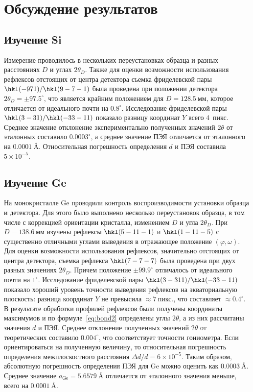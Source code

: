 \documentclass[a4paper,14pt]{extarticle}
\newcommand{\unit}[1]{ \ \text{#1}}
\newcommand{\degree}{^\circ}
\newcounter{x}
\begin{document}
\section{Обсуждение результатов}
\subsection{Изучение Si}
Измерение проводилось в нескольких переустановках образца и разных расстояниях $D$ и углах $2\theta_D$.
Также для оценки возможности использования рефлексов отстоящих от центра детектора съемка фриделевской пары $\hkl(-9 7 1)/\hkl(9 -7 -1)$ была проведена при положении детектора $2\theta_D = \pm 97.5\degree$, что является крайним положением для $D = 128.5\unit{мм}$, которое отличается от идеального почти на $0.8\degree$.
Исследование фриделевской пары $\hkl(3 -3 1)/\hkl(-3 3 -11)$ показало разницу координат $Y$ всего 4~пикс.
Среднее значение отклонение экспериментально полученных значений $2\theta$ от эталонных составило $0.0003\degree$, а среднее значение ПЭЯ отличается от эталонного на $0.0001\unit{\AA}$.
Относительная погрешность определения $d$ и ПЭЯ составила $5 \times 10^{-5}$.
\subsection{Изучение Ge}
На монокристалле Ge проводили контроль воспроизводимости установки образца и детектора.
Для этого было выполнено несколько переустановок образца, в том числе с коррекцией ориентации кристалла, изменением $D$ и угла $2\theta_D$.
При $D = 138.6\unit{мм}$ изучены рефлексы $\hkl(5 -11 -1)$ и $\hkl(1 -11 -5)$ с существенно отличными углами выведения в отражающее положение $(\varphi, \omega)$.
Для оценки возможности использования рефлексов, значительно отстоящих от центра детектора, съемка рефлекса $\hkl(7 -7 -7)$ была проведена при двух разных значениях $2\theta_D$.
Причем положение $\pm 99.9\degree$ отличалось от идеального почти на $1\degree$.
Исследование фриделевской пары $\hkl(3 -3 11)/\hkl(-3 3 -11)$ показало хороший уровень точности выведения рефлексов на экваториальную плоскость: разница координат $Y$ не превысила $\approx 7\unit{пикс.}$, что составляет $\approx 0.4\degree$.
В результате обработки профилей рефлексов были получены координаты максимумов и по формуле~\ref{eq:bond2} определены углы $2\theta$, а из них рассчитаны значения $d$ и ПЭЯ.
Среднее отклонение полученных значений $2\theta$ от теоретических составило $0.004\degree$, что соответствует точности гониометра.
Если ориентироваться на полученную величину, то относительная погрешность определения межплоскостного расстояния $\Delta d / d = 6 \times 10^{-5}$.
Таким образом, абсолютную погрешность определения ПЭЯ для Ge можно оценить как $0.0003\unit{\AA}$.
Среднее значение $a_\text{Ge} = 5.6579\unit{\AA}$ отличается от эталонного значения меньше, всего на $0.0001\unit{\AA}$.
\end{document}
